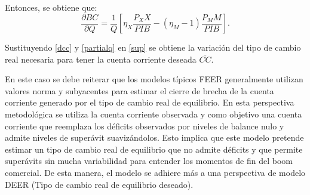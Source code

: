 \documentclass[12pt,letterpaper]{article}
\begin{document}
Entonces, se obtiene que:
\begin{equation}\label{partialq}
\frac{\partial BC}{\partial Q}=\frac{1}{Q} \left[\eta_X \frac{P_X X}{PIB}-(\eta_M -1)\frac{P_M M}{PIB}\right].
\end{equation}

Sustituyendo \ref{dcc} y \ref{partialq} en \ref{sup} se obtiene la variación del tipo de cambio real necesaria para tener la cuenta corriente deseada $\bar{CC}$.


En este caso se debe reiterar que los modelos típicos FEER generalmente utilizan valores norma y subyacentes para estimar el cierre de brecha de la cuenta corriente generado por el tipo de cambio real de equilibrio. En esta perspectiva metodológica se utiliza la cuenta corriente observada y como objetivo una cuenta corriente que reemplaza los déficits observados por niveles de balance nulo y admite niveles de superávit suavizándolos. Esto implica que este modelo pretende estimar un tipo de cambio real de equilibrio que no admite déficits y que permite superávits sin mucha variabilidad para entender los momentos de fin del boom comercial. De esta manera, el modelo se adhiere más a una perspectiva de modelo DEER (Tipo de cambio real de equilibrio deseado).
\end{document}
